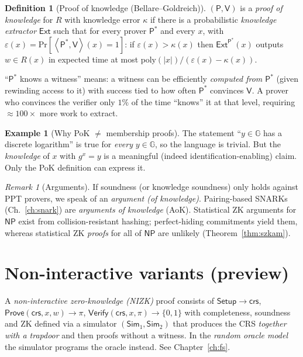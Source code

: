 \documentclass[11pt,a4paper]{report}
\theoremstyle{plain}
\theoremstyle{definition}
\newtheorem{definition}[theorem]{Definition}
\newtheorem{example}[theorem]{Example}
\theoremstyle{remark}
\newtheorem{remark}[theorem]{Remark}
\newcommand{\GG}{\mathbb{G}}
\newcommand{\poly}{\mathrm{poly}}
\renewcommand{\Pr}{\mathrm{Pr}}
\newcommand{\Prv}{\mathsf{P}}\newcommand{\Ver}{\mathsf{V}}
\newcommand{\Sim}{\mathsf{Sim}}\newcommand{\Ext}{\mathsf{Ext}}
\newcommand{\NP}{\mathsf{NP}}\newcommand{\BPP}{\mathsf{BPP}}\newcommand{\IP}{\mathsf{IP}}
\newcommand{\Setup}{\mathsf{Setup}}\newcommand{\Com}{\mathsf{Com}}
\newcommand{\pair}[2]{\left\langle #1,#2\right\rangle}
\begin{document}
\begin{definition}[Proof of knowledge (Bellare--Goldreich)]\label{def:pok}
$(\Prv,\Ver)$ is a \emph{proof of knowledge} for $R$ with knowledge error $\kappa$ if there is a probabilistic \emph{knowledge extractor} $\Ext$ such that for every prover $\Prv^*$ and every $x$, with $\varepsilon(x)=\Pr[\pair{\Prv^*}{\Ver}(x)=1]$: if $\varepsilon(x)>\kappa(x)$ then $\Ext^{\Prv^*}(x)$ outputs $w\in R(x)$ in expected time at most $\poly(|x|)/(\varepsilon(x)-\kappa(x))$.
\end{definition}
\begin{intuition}
``$\Prv^*$ knows a witness'' means: a witness can be efficiently \emph{computed from $\Prv^*$} (given rewinding access to it) with success tied to how often $\Prv^*$ convinces $\Ver$. A prover who convinces the verifier only $1\%$ of the time ``knows'' it at that level, requiring $\approx100\times$ more work to extract.
\end{intuition}
\begin{example}[Why PoK $\neq$ membership proofs]
The statement ``$y\in\GG$ has a discrete logarithm'' is true for \emph{every} $y\in\GG$, so the language is trivial. But the \emph{knowledge} of $x$ with $g^x=y$ is a meaningful (indeed identification-enabling) claim. Only the PoK definition can express it.
\end{example}
\begin{remark}[Arguments]
If soundness (or knowledge soundness) only holds against PPT provers, we speak of an \emph{argument (of knowledge)}. Pairing-based SNARKs (Ch.~\ref{ch:snark}) are \emph{arguments of knowledge} (AoK). Statistical ZK arguments for $\NP$ exist from collision-resistant hashing; perfect-hiding commitments yield them, whereas statistical ZK \emph{proofs} for all of $\NP$ are unlikely (Theorem~\ref{thm:szkam}).
\end{remark}

\section{Non-interactive variants (preview)}
A \emph{non-interactive zero-knowledge (NIZK)} proof consists of $\Setup\to\mathsf{crs}$, $\mathsf{Prove}(\mathsf{crs},x,w)\to\pi$, $\mathsf{Verify}(\mathsf{crs},x,\pi)\to\{0,1\}$ with completeness, soundness and ZK defined via a simulator $(\Sim_1,\Sim_2)$ that produces the CRS \emph{together with a trapdoor} and then proofs without a witness. In the \emph{random oracle model} the simulator programs the oracle instead. See Chapter~\ref{ch:fs}.
\end{document}
